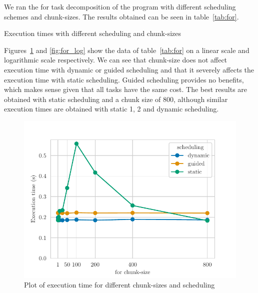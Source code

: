 We ran the for task decomposition of the program with different scheduling schemes and chunk-sizes. The
results obtained can be seen in table~\ref{tab:for}.

\begin{table}[H]
    \caption{Execution times with different scheduling and chunk-sizes}%
    \label{tab:for}
    \begin{center}
    
    \end{center}
\end{table}

Figures~\ref{fig:for} and \ref{fig:for_log} show the data of table~\ref{tab:for} on a linear scale and logarithmic
scale respectively. We can see that chunk-size does not affect execution time with dynamic or guided scheduling
and that it severely affects the execution time with static scheduling. Guided scheduling provides no benefits, which
makes sense given that all tasks have the same cost. The best results are obtained with static scheduling and
a chunk size of 800, although similar execution times are obtained with static 1, 2 and dynamic scheduling.


\begin{figure}[H]
    \centering
    \includegraphics{plots/for-scheduling.pdf}
    \caption{Plot of execution time for different chunk-sizes and scheduling}
    \label{fig:for} 
\end{figure}

